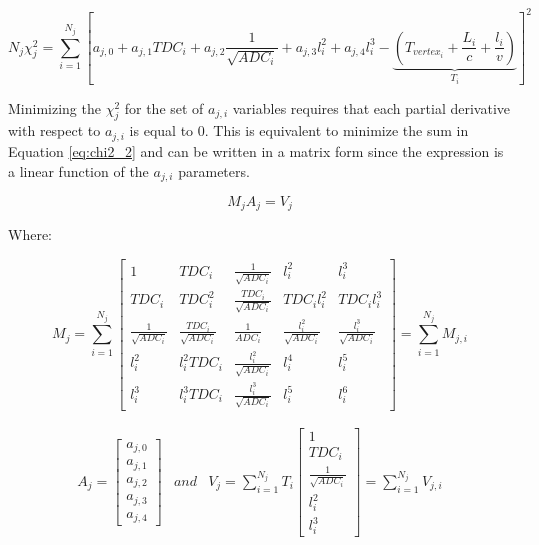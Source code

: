 \documentclass [12pt,letterpaper]{article}
\begin{document}
\begin{equation}
N_{j} \chi^{2}_{j} = \sum_{i = 1}^{N_{j}} [a_{j, 0} + a_{j, 1} TDC_i + a_{j, 2}\frac{1}{\sqrt{ADC_i} } + a_{j, 3} l_i^2 + a_{j, 4} l_i^3 - \underbrace{(T_{vertex_i} + \frac{ L_i }{ c } + \frac{l_i}{v})}_{T_i}]^2  \label{eq:chi2_2}
\end{equation}

Minimizing the $\chi^{2}_{j}$ for the set of ${a_{j, i}}$ variables requires that each partial derivative with respect to ${a_{j, i}}$ is equal to 0. This is equivalent to minimize the sum in Equation \ref{eq:chi2_2} and can be written in a matrix form since the expression is a linear function of the $a_{j, i}$ parameters.

\begin{equation}
M_{j} A_{j} = V_{j}  \label{eq:matrixeq}
\end{equation}

Where:

\begin{equation}
M_{j} = \sum_{i = 1}^{N_{j}}
	\left[
	\begin{array}{lllll}
		1 &  TDC_i &  \frac{1}{\sqrt{ADC_i}}  & l_i^2 & l_i^3 \\	
		TDC_i & TDC_i^2 &  \frac{TDC_i}{\sqrt{ADC_i}} &  {TDC_i l_i^2} &  {TDC_i l_i^3} \\
		\frac{1}{\sqrt{ADC_i}} & \frac{TDC_i}{\sqrt{ADC_i}} &  \frac{1}{ADC_i} & \frac{l_i^2}{\sqrt{ADC_i}} & \frac{l_i^3}{\sqrt{ADC_i}} \\
		l_i^2 & l_i^2 TDC_i &  \frac{l_i^2}{\sqrt{ADC_i}} &  {l_i^4} &  {l_i^5} \\
		l_i^3 & l_i^3 TDC_i &  \frac{l_i^3}{\sqrt{ADC_i}} &  {l_i^5} &  {l_i^6}
	\end{array}
  	\right]
      = \sum_{i = 1}^{N_{j}} M_{j, i}
\end{equation}

\begin{equation}
\begin{array}{ccc}
 A_{j} = \left[
	\begin{array}{c}
		a_{j,0} \\
		a_{j,1} \\
		a_{j,2} \\ 
		a_{j,3} \\ 
		a_{j,4}
	\end{array}
     	\right]
&
 and
&
V_{j} = \displaystyle \sum_{i = 1}^{N_{j}} T_i
	\left[	
	\begin{array}{l}
		1 \\ 
		TDC_i  \\
		\frac{1}{\sqrt{ADC_i}} \\ 
		l_i^2 \\   
		l_i^3
	\end{array}
     	\right] 
      = \sum_{i = 1}^{N_{j}} V_{j, i}
\end{array}
\end{equation}
\end{document}
